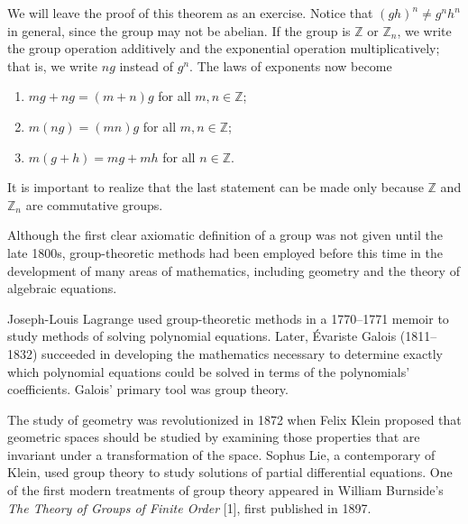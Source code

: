  
We will leave the proof of this theorem as an exercise. Notice that
$(gh)^n \neq g^nh^n$ in general, since the group may not be abelian.
If the group is ${\mathbb Z}$ or ${\mathbb Z}_n$, we write the group
operation additively and the exponential operation multiplicatively;
that is, we write $ng$ instead of $g^n$. The laws of exponents now
become 
\begin{enumerate}
 
\item
$mg + ng = (m+n)g$ for all $m, n \in {\mathbb Z}$;
 
\item
$m(ng) = (mn)g$ for all $m, n \in {\mathbb Z}$;
 
\item
$m(g + h) = mg + mh$ for all $n \in {\mathbb Z}$.
 
\end{enumerate}
It is important to realize that the last statement can be made only
because ${\mathbb Z}$ and  ${\mathbb Z}_n$ are commutative groups.
 
 
 
 
\histhead
 
 
\noindent
{\small \histf
Although the first clear axiomatic definition of a group was not given
until the late 1800s,  group-theoretic methods had been employed
before this time in the development of  many areas of mathematics,
including geometry and the theory of algebraic equations.  
 

Joseph-Louis Lagrange used
group-theoretic methods in a 1770--1771 memoir to study methods of
solving polynomial equations.  Later, \'{E}variste
Galois (1811--1832) succeeded in
developing the mathematics necessary to determine exactly which
polynomial equations could be  solved in terms of the polynomials'
coefficients. Galois' primary tool was group theory. 
}

{\small \histf
The study of geometry was revolutionized in 1872 when Felix
Klein proposed that geometric spaces should be
studied by examining those properties that are invariant under a
transformation of the space. Sophus Lie, a
contemporary of Klein, used group theory to study solutions of
partial differential equations.  One of the first modern treatments of
group theory appeared in William Burnside's
{\it The Theory of Groups of Finite Order\/} [1], first published in
1897.  
\histbox
}


